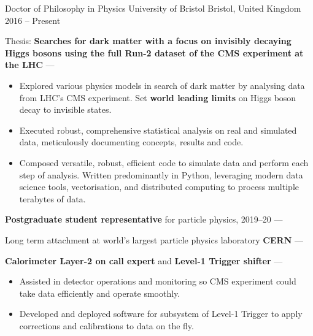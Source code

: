 
\def\vPaddingLength{0.75mm}
\newcommand{\vpaddingEduSubpoint}{\vspace{\vPaddingLength}} %


\begin{cventries}
    \cventry
        {Doctor of Philosophy in Physics} %
        {University of Bristol} %
        {Bristol, United Kingdom} %
        {2016 -- Present} %
        {
        \begin{cvitems} %
            \item {Thesis: \textbf{Searches for dark matter with a focus on invisibly decaying Higgs bosons using the full Run-2 dataset of the CMS experiment at the LHC} --- }
            \vpaddingEduSubpoint
            \begin{itemize}[itemsep=\vPaddingLength, label=\bullet]
                \item{Explored various physics models in search of dark matter by analysing data from LHC's CMS experiment. Set \textbf{world leading limits} on Higgs boson decay to invisible states.}
                \item{Executed robust, comprehensive statistical analysis on real and simulated data, meticulously documenting concepts, results and code.}
                \item{Composed versatile, robust, efficient code to simulate data and perform each step of analysis. Written predominantly in Python, leveraging modern data science tools, vectorisation, and distributed computing to process multiple terabytes of data.}
            \end{itemize}
            \item {\textbf{Postgraduate student representative} for particle physics, 2019--20 --- }
            \item {Long term attachment at world's largest particle physics laboratory \textbf{CERN} --- }
            \item {\textbf{Calorimeter Layer-2 on call expert} and \textbf{Level-1 Trigger shifter} --- }
            \vpaddingEduSubpoint
            \begin{itemize}[itemsep=\vPaddingLength, label=\bullet]
                \item{Assisted in detector operations and monitoring so CMS experiment could take data efficiently and operate smoothly.}
                \item{Developed and deployed software for subsystem of Level-1 Trigger to apply corrections and calibrations to data on the fly.}
            \end{itemize}
        \end{cvitems}
        }


\end{cventries}
